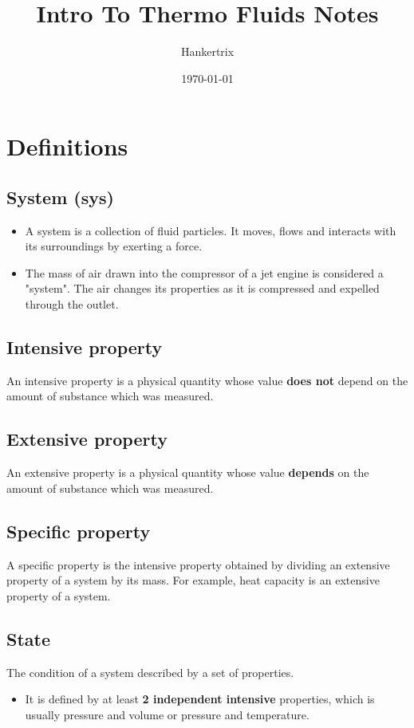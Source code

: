 \documentclass[11pt]{article}
\author{Hankertrix}
\date{\today}
\title{Intro To Thermo Fluids Notes}
\begin{document}
\maketitle
\setcounter{tocdepth}{2}
\tableofcontents \clearpage\section{Definitions}
\label{sec:orge04bf0d}

\subsection{System (sys)}
\label{sec:org02ae16a}
\begin{itemize}
\item A system is a collection of fluid particles. It moves, flows and interacts with its surroundings by exerting a force.
\item The mass of air drawn into the compressor of a jet engine is considered a "system". The air changes its properties as it is compressed and expelled through the outlet.
\end{itemize}
\subsection{Intensive property}
\label{sec:orgb0b2459}
An intensive property is a physical quantity whose value \textbf{does not} depend on the amount of substance which was measured.
\subsection{Extensive property}
\label{sec:org6eef32b}
An extensive property is a physical quantity whose value \textbf{depends} on the amount of substance which was measured.
\subsection{Specific property}
\label{sec:org4a5a47c}
A specific property is the intensive property obtained by dividing an extensive property of a system by its mass. For example, heat capacity is an extensive property of a system.
\subsection{State}
\label{sec:orga77465f}
The condition of a system described by a set of properties.
\begin{itemize}
\item It is defined by at least \textbf{2 independent intensive} properties, which is usually pressure and volume or pressure and temperature.
\end{itemize}
\end{document}

